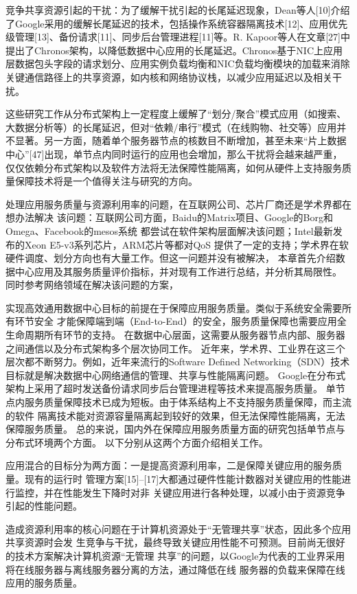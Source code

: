 竞争共享资源引起的干扰：为了缓解干扰引起的长尾延迟现象，Dean等人[10]介绍了Google采用的缓解长尾延迟的技术，包括操作系统容器隔离技术[12]、应用优先级管理[13]、备份请求[11]、同步后台管理进程[11]等。R. Kapoor等人在文章[27]中提出了Chronos架构，以降低数据中心应用的长尾延迟。Chronos基于NIC上应用层数据包头字段的请求划分、应用实例负载均衡和NIC负载均衡模块的加载来消除关键通信路径上的共享资源，如内核和网络协议栈，以减少应用延迟以及相关干扰。

这些研究工作从分布式架构上一定程度上缓解了“划分/聚合”模式应用（如搜索、大数据分析等）的长尾延迟，但对“依赖/串行”模式（在线购物、社交等）应用并不显著。另一方面，随着单个服务器节点的核数目不断增加，甚至未来“片上数据中心”[47]出现，单节点内同时运行的应用也会增加，那么干扰将会越来越严重，仅仅依赖分布式架构以及软件方法将无法保障性能隔离，如何从硬件上支持服务质量保障技术将是一个值得关注与研究的方向。



处理应用服务质量与资源利用率的问题，在互联网公司、芯片厂商还是学术界都在想办法解决
该问题：互联网公司方面，Baidu的Matrix项目、Google的Borg和Omega、Facebook的mesos系统
都尝试在软件架构层面解决该问题；Intel最新发布的Xeon E5-v3系列芯片，ARM芯片等都对QoS
提供了一定的支持；学术界在软硬件调度、划分方向也有大量工作。但这一问题并没有被解决，
本章首先介绍数据中心应用及其服务质量评价指标，并对现有工作进行总结，并分析其局限性。
同时参考网络领域在解决该问题的方案，

实现高效通用数据中心目标的前提在于保障应用服务质量。类似于系统安全需要所有环节安全
才能保障端到端（End-to-End）的安全，服务质量保障也需要应用全生命周期所有环节的支持。
在数据中心层面，这需要从服务器节点内部、服务器之间通信以及分布式架构多个层次协同工作。
近年来，学术界、工业界在这三个层次都不断努力。例如，近年来流行的Software Defined
Networking（SDN）技术\cite{SDN}目标就是解决数据中心网络通信的管理、共享与性能隔离问题。
Google在分布式架构上采用了超时发送备份请求同步后台管理进程等技术\cite{dean_achieving_2012}来提高服务质量。
单节点内服务质量保障技术已成为短板。由于体系结构上不支持服务质量保障，而主流的软件
隔离技术能对资源容量隔离起到较好的效果，但无法保障性能隔离，无法保障服务质量。
总的来说，国内外在保障应用服务质量方面的研究包括单节点与分布式环境两个方面。
以下分别从这两个方面介绍相关工作。


应用混合的目标分为两方面：一是提高资源利用率，二是保障关键应用的服务质量。现有的运行时
管理方案[15]–[17]大都通过硬件性能计数器对关键应用的性能进行监控，并在性能发生下降时对非
关键应用进行各种处理，以减小由于资源竞争引起的性能问题。

造成资源利用率的核心问题在于计算机资源处于“无管理共享”状态，因此多个应用共享资源时会发
生竞争与干扰，最终导致关键应用性能不可预测。目前尚无很好的技术方案解决计算机资源“无管理
共享”的问题，以Google为代表的工业界采用将在线服务器与离线服务器分离的方法，通过降低在线
服务器的负载来保障在线应用的服务质量。

